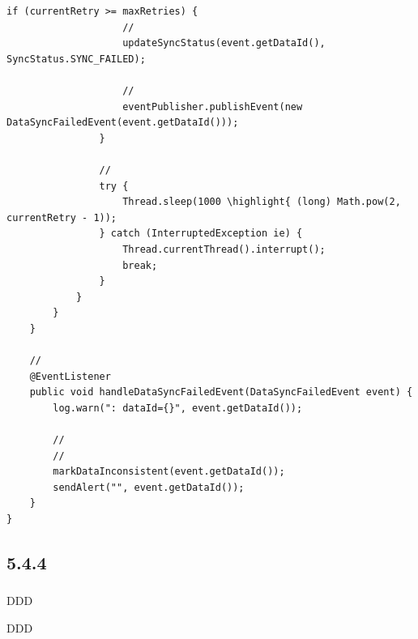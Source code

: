 \begin{lstlisting}[style=java]
                if (currentRetry >= maxRetries) {
                    // 
                    updateSyncStatus(event.getDataId(), SyncStatus.SYNC_FAILED);
                    
                    // 
                    eventPublisher.publishEvent(new DataSyncFailedEvent(event.getDataId()));
                }
                
                // 
                try {
                    Thread.sleep(1000 \highlight{ (long) Math.pow(2, currentRetry - 1));
                } catch (InterruptedException ie) {
                    Thread.currentThread().interrupt();
                    break;
                }
            }
        }
    }
    
    // 
    @EventListener
    public void handleDataSyncFailedEvent(DataSyncFailedEvent event) {
        log.warn(": dataId={}", event.getDataId());
        
        // 
        // 
        markDataInconsistent(event.getDataId());
        sendAlert("", event.getDataId());
    }
}
\end{lstlisting}

\hypertarget{section-67}{%
\subsection{5.4.4}\label{section-67}}

\hypertarget{section-68}{%
\subsubsection{}\label{section-68}}


\important{}DDD

\important{}DDD

